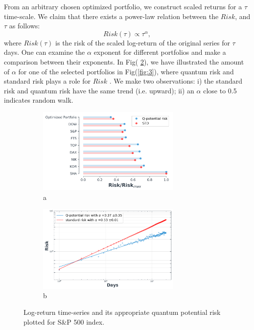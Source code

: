 \documentclass[journal,article,submit,moreauthors,pdftex]{Definitions/mdpi}
\begin{document}
From an arbitrary chosen optimized portfolio, we construct scaled returns
for a $\tau $ time-scale. We claim that there exists a power-law relation
between the $Risk$, and $\tau $ as follows: 
\begin{equation}
	Risk(\tau )\propto \tau ^{\alpha },
\end{equation}%
where $Risk(\tau )$ is the risk of the scaled log-return of the original
series for $\tau $ days. One can examine the $\alpha $ exponent for
different portfolios and make a comparison between their exponents. In Fig(%
\ref{fig3:sub2}), we have illustrated the amount of $\alpha $ for one of the
selected portfolios in Fig(\ref{fig:3}), where quantum risk and standard
risk plays a role for $Risk$ . We make two observations: i) the standard
risk and quantum risk have the same trend (i.e. upward); ii) an $\alpha $
close to 0.5 indicates random walk.  
\begin{figure}[tbh]
	\begin{subfigure}{0.49\textwidth}
		\centering
		\includegraphics[width=70mm]{fig1.png}
		\caption{a}
		\label{fig3:sub1}
	\end{subfigure}
	\begin{subfigure}{0.49\textwidth}
		\centering
		\includegraphics[width=70mm]{fig3_a.png}
		\caption{b}
		\label{fig3:sub2}
	\end{subfigure}
	\caption{Log-return time-series and its appropriate quantum potential risk
		plotted for S\&P 500 index.}
	\label{fig:4}
\end{figure}
\end{document}
